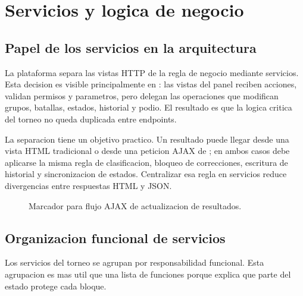 \chapter{Servicios y logica de negocio}
\label{chap:servicios-logica-negocio}

\section{Papel de los servicios en la arquitectura}
\label{sec:servicios-papel}

La plataforma separa las vistas HTTP de la regla de negocio mediante servicios. Esta decision es visible principalmente en : las vistas del panel reciben acciones, validan permisos y parametros, pero delegan las operaciones que modifican grupos, batallas, estados, historial y podio. El resultado es que la logica critica del torneo no queda duplicada entre endpoints.

La separacion tiene un objetivo practico. Un resultado puede llegar desde una vista HTML tradicional o desde una peticion AJAX de ; en ambos casos debe aplicarse la misma regla de clasificacion, bloqueo de correcciones, escritura de historial y sincronizacion de estados. Centralizar esa regla en servicios reduce divergencias entre respuestas HTML y JSON.

\begin{figure}[H]
  \centering
  \caption{Marcador para flujo AJAX de actualizacion de resultados.}
  \label{fig:servicios-ajax-resultados}
\end{figure}

\section{Organizacion funcional de servicios}
\label{sec:servicios-organizacion}

Los servicios del torneo se agrupan por responsabilidad funcional. Esta agrupacion es mas util que una lista de funciones porque explica que parte del estado protege cada bloque.


